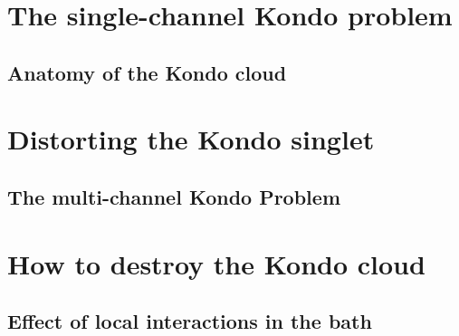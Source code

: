 \documentclass[aspectratio=169]{beamer}
\begin{document}
\section{The single-channel Kondo problem}
\subsection{Anatomy of the Kondo cloud}

\section{Distorting the Kondo singlet}
\subsection{The multi-channel Kondo Problem}

\section{How to destroy the Kondo cloud}
\subsection{Effect of local interactions in the bath}
\end{document}

